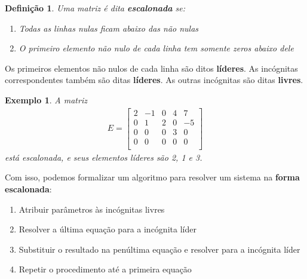 \documentclass{article}
\newtheorem*{definition}{Definição}
\newtheorem*{example}{Exemplo}
\begin{document}
\begin{definition}
	Uma matriz é dita \textbf{escalonada} se:
	\begin{enumerate}
		\item Todas as linhas nulas ficam abaixo das não nulas
		\item O primeiro elemento não nulo de cada linha tem somente zeros abaixo dele
	\end{enumerate}
\end{definition}
\par\vspace{0.3cm} Os primeiros elementos não nulos de cada linha são ditos \textbf{líderes}. As incógnitas correspondentes também são ditas \textbf{líderes}. As outras incógnitas são ditas \textbf{livres}.

\begin{example}
	A matriz
	\begin{align*}
	E = \begin{bmatrix}
		2 & -1 & 0 & 4 & 7 \\
		0 & 1 & 2 & 0 & -5 \\
		0 & 0 & 0 & 3 & 0 \\
		0 & 0 & 0 & 0 & 0 \\
	\end{bmatrix}
	\end{align*}
	está escalonada, e seus elementos líderes são 2, 1 e 3.
\end{example}
\par\vspace{0.3cm} Com isso, podemos formalizar um algoritmo para resolver um sistema na \textbf{forma escalonada}:
\begin{enumerate}
	\item Atribuir parâmetros às incógnitas livres
	\item Resolver a última equação para a incógnita líder
	\item Substituir o resultado na penúltima equação e resolver para a incógnita líder
	\item Repetir o procedimento até a primeira equação
\end{enumerate} 
\end{document}
